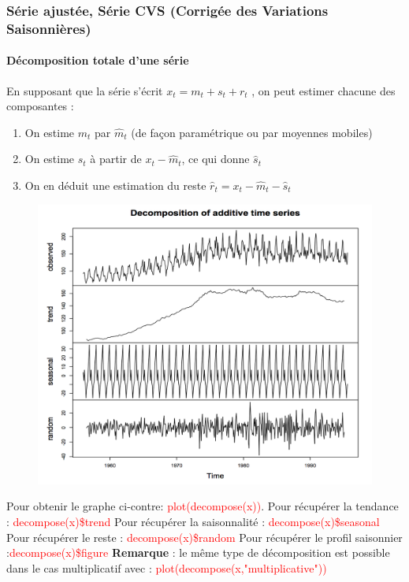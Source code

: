 \subsubsection{Série ajustée, Série CVS (Corrigée des Variations Saisonnières)}
\paragraph{Décomposition totale d'une série}
En supposant que la série s'écrit $x_{t} = m_{t} + s_{t} + r_{t}$ , on peut estimer chacune des composantes :
\begin{enumerate}
\item On estime $m_{t}$ par $\hat{m}_{t}$ (de façon paramétrique ou par moyennes mobiles)
\item On estime $s_{t}$ à partir de $x_{t} - \hat{m}_{t}$, ce qui donne $\hat{s}_{t}$
\item On en déduit une estimation du reste $\hat{r}_{t} = x_{t}-\hat{m}_{t}-\hat{s}_{t}$
\end{enumerate}
\begin{figure}[H]\begin{center}\includegraphics[scale=0.7]{ilu/ccm40.png}\end{center}\end{figure}
Pour obtenir le graphe ci-contre: \textcolor{red}{plot(decompose(x))}.\newline
Pour récupérer la tendance : \textcolor{red}{decompose(x)\$trend}\newline
Pour récupérer la saisonnalité : \textcolor{red}{decompose(x)\$seasonal}\newline
Pour récupérer le reste : \textcolor{red}{decompose(x)\$random}\newline
Pour récupérer le profil saisonnier :\textcolor{red}{decompose(x)\$figure}\newline
\textbf{Remarque} : le même type de décomposition est possible dans le cas multiplicatif avec : \textcolor{red}{plot(decompose(x,"multiplicative"))}

